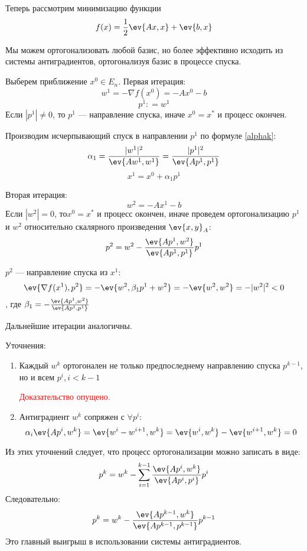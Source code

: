 Теперь рассмотрим минимизацию функции
\[f(x) = \frac{1}{2} \ev{Ax, x} + \ev{b, x}\]

Мы можем ортогонализовать любой базис, но более эффективно исходить из системы антиградиентов, ортогонализуя базис в процессе спуска.

Выберем приближение \(x^0 \in E_n\). Первая итерация:
\[w^1 = - \nabla f(x^0) = - Ax^0 - b\]
\[p^1 : = w^1\]
Если \(|p^1| \neq 0\), то \(p^1\) --- направление спуска, иначе \(x^0 = x^*\) и процесс окончен.

Производим исчерпывающий спуск в направлении \(p^1\) по формуле \eqref{alphak}:
\[\alpha_1 = \frac{|w^1|^2}{\ev{Aw^1, w^1}} = \frac{|p^1|^2}{\ev{Ap^1, p^1}}\]
\[x^1 = x^0 + \alpha_1 p^1\]

Вторая итерация:
\[w^2 = - Ax^1 - b\]
Если \(|w^2| = 0\), то\(x^0 = x^*\) и процесс окончен, иначе проведем ортогонализацию \(p^1\) и \(w^2\) относительно скалярного произведения \(\ev{x, y}_A\):
\begin{equation}
    p^2 = w^2 - \frac{\ev{Ap^1, w^2}}{\ev{Ap^1, p^1}} p^1
    \label{p2}
\end{equation}

\(p^2\) --- направление спуска из \(x^1\):
\[\ev{\nabla f(x^1), p^2} = - \ev{w^2, \beta_1 p^1 + w^2} = - \ev{w^2, w^2} = - |w^2|^2 < 0\]
, где \(\beta_1 = - \frac{\ev{Ap^1, w^2}}{\ev{Ap^1, p^1}}\)

Дальнейшие итерации аналогичны.

Уточнения:
\begin{enumerate}
    \item Каждый \(w^k\) ортогонален не только предпоследнему направлению спуска \(p^{k - 1}\), но и всем \(p^i, i < k - 1\)

          \textcolor{red}{Доказательство опущено.}

    \item Антиградиент \(w^k\) сопряжен с \(\forall p^i\):
          \[\alpha_i \ev{Ap^i, w^k} = \ev{w^i - w^{i + 1}, w^k} = \ev{w^i, w^k} - \ev{w^{i + 1}, w^k} = 0\]
\end{enumerate}

Из этих уточнений следует, что процесс ортогонализации можно записать в виде:
\[p^k = w^k - \sum_{i = 1}^{k - 1} \frac{\ev{Ap^i, w^k}}{\ev{Ap^i, p^i}} p^i\]
Следовательно:
\[p^k = w^k - \frac{\ev{Ap^{k - 1}, w^k}}{\ev{A p^{k - 1}, p^{k - 1}}} p^{k - 1}\]
Это главный выигрыш в использовании системы антиградиентов.

